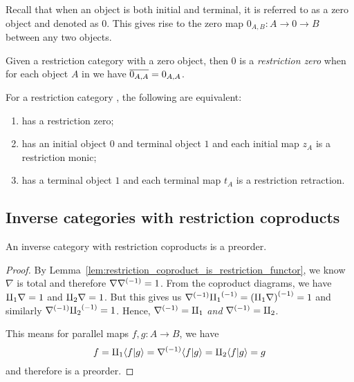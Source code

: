 Recall that when an object is both initial and terminal, it is referred to as a zero object and
denoted as $0$. This gives rise to the zero map $0_{A,B}: A \to 0 \to B$ between any two objects.

\begin{definition}\label{def:restriction_zero}
  Given a restriction category \X with a zero object, then $0$ is a \emph{restriction zero} when
  for each object $A$ in \X we have $\overline{0_{A,A}} = 0_{A,A}$.
\end{definition}

\begin{lemma}\label{lem:restriction_zero_equivalences}
  For a restriction category \X, the following are equivalent:
  \begin{enumerate}[{(}i{)}]
    \item \X has a restriction zero;
    \item \X has an initial object $0$ and terminal object $1$ and each initial map $z_A$ is a
      restriction monic;
    \item \X has a terminal object $1$ and each terminal map $t_A$ is a restriction retraction.
  \end{enumerate}
\end{lemma}




\subsection{Inverse categories with restriction coproducts} %
\label{sub:inverse_categories_with_restriction_coproducts}


\begin{proposition}
  An inverse category \X with restriction coproducts is a preorder.
\end{proposition}
\begin{proof}
  By Lemma~\ref{lem:restriction_coproduct_is_restriction_functor}, we know $\nabla$ is total and
  therefore $\nabla{\nabla}^{(-1)} = 1$. From the coproduct diagrams, we have $\amalg_{1}\nabla =1$ and
  $\amalg_{2}\nabla = 1$. But this gives us ${\nabla}^{(-1)}{\amalg_{1}}^{(-1)} = {(\amalg_{1}\nabla)}^{(-1)} = 1$ and
  similarly ${\nabla}^{(-1)}{\amalg_{2}}^{(-1)} =1$. Hence, ${\nabla}^{(-1)} = \amalg_{1}$ \emph{and} ${\nabla}^{(-1)} =
  \amalg_{2}$.

  This means for parallel maps $f,g:A \to B$, we have
  \[
    f = \amalg_{1} \langle f|g\rangle = {\nabla}^{(-1)} \langle f|g\rangle = \amalg_{2}\langle f|g\rangle = g
  \]
  and therefore \X is a preorder.
\end{proof}

